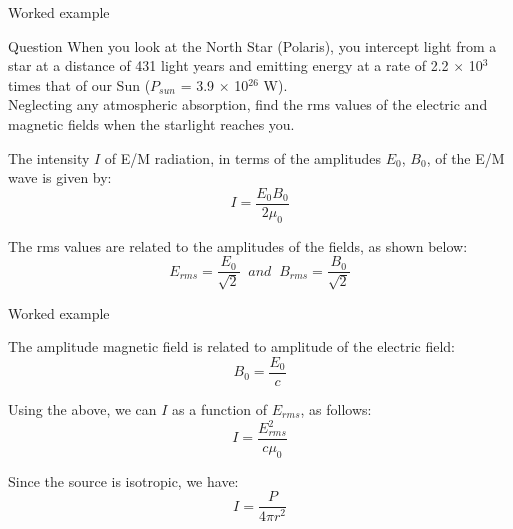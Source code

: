
%
%

{
\problemslide

%
%
%

\begin{frame}{Worked example}

  \begin{blockexmplque}{Question}
    When you look at the North Star (Polaris), you intercept light
    from a star at a distance of 431 light years and emitting energy
    at a rate of 2.2 $\times$ 10$^3$ times that of our Sun
    ($P_{sun}$ = 3.9 $\times$ 10$^{26}$ W).\\
    Neglecting any atmospheric absorption, find the rms values of
    the electric and magnetic fields when the starlight reaches you.
  \end{blockexmplque}

  The intensity $I$ of E/M radiation, in terms of the amplitudes $E_0$, $B_0$,
  of the E/M wave is given by:
  \begin{equation*}
    I = \frac{E_{0} B_{0}}{2\mu_0}
  \end{equation*}

  The rms values are related to the amplitudes of the fields, as shown below:
  \begin{equation*}
    E_{rms} = \frac{E_{0}}{\sqrt{2}} \;\; and \;\;
    B_{rms} = \frac{B_{0}}{\sqrt{2}}
  \end{equation*}

\end{frame}

%
%
%

\begin{frame}{Worked example}

  The amplitude magnetic field is related to amplitude of the
  electric field:
  \begin{equation*}
    B_{0} = \frac{E_{0}}{c}
  \end{equation*}

  Using the above, we can $I$ as a function of $E_{rms}$, as follows:
  \begin{equation*}
    I = \frac{E_{rms}^2}{c\mu_0}
  \end{equation*}

  Since the source is isotropic, we have:
  \begin{equation*}
    I = \frac{P}{4\pi r^2}
  \end{equation*}


\end{frame}}
